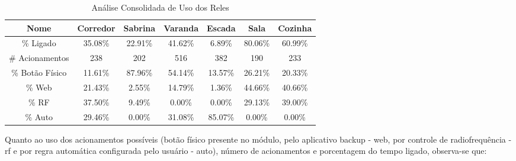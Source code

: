 \begin{table}[H]
	\caption{Análise Consolidada de Uso dos Reles}
	\setlength\tabcolsep{1.5pt}
	\centering
	\footnotesize
	\begin{tabular}{ccccccc}
		\textbf{Nome} &
		\textbf{Corredor} &
		\textbf{Sabrina} &
		\textbf{Varanda} &
		\textbf{Escada} &
		\textbf{Sala} &
		\textbf{Cozinha} \\
		\midrule
		\% Ligado &
		35.08\% &
		22.91\% &
		41.62\% &
		6.89\% &
		80.06\% &
		60.99\% \\
		\# Acionamentos &
		238 &
		202 &
		516 &
		382 &
		190 &
		233 \\
		\% Botão Físico &
		11.61\% &
		87.96\% &
		54.14\% &
		13.57\% &
		26.21\% &
		20.33\% \\
		\% Web &
		21.43\% &
		2.55\% &
		14.79\% &
		1.36\% &
		44.66\% &
		40.66\% \\
		\% RF &
		37.50\% &
		9.49\% &
		0.00\% &
		0.00\% &
		29.13\% &
		39.00\% \\
		\% Auto &
		29.46\% &
		0.00\% &
		31.08\% &
		85.07\% &
		0.00\% &
		0.00\% \\
	\end{tabular}
\end{table}

Quanto ao uso dos acionamentos possíveis (botão físico presente no módulo, pelo aplicativo backup - web, por controle de radiofrequência - rf e por regra automática configurada pelo usuário - auto), número de acionamentos e porcentagem do tempo ligado, observa-se que:

